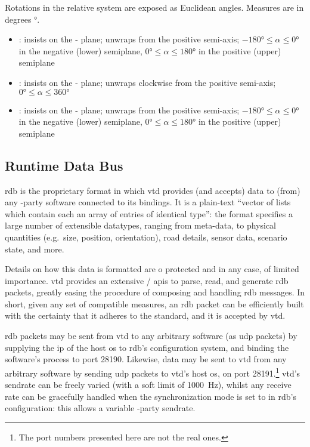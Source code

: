 \FLOATnoindent Rotations in the relative system are exposed as Euclidean angles. Measures are in degrees \si{\degree}.

\begin{itemize}
	\item {}: insists on the - plane; unwraps from the positive  semi-axis; $\ang{-180} \leqslant \alpha \leqslant \ang{0}$ in the negative (lower) semiplane, $\ang{0} \leqslant \alpha \leqslant \ang{180}$ in the positive (upper) semiplane
	\item {}: insists on the - plane; unwraps clockwise from the positive  semi-axis; $\ang{0} \leqslant \alpha \leqslant \ang{360}$
	\item {}: insists on the - plane; unwraps from the positive  semi-axis; $\ang{-180} \leqslant \alpha \leqslant \ang{0}$ in the negative (lower) semiplane, $\ang{0} \leqslant \alpha \leqslant \ang{180}$ in the positive (upper) semiplane
\end{itemize}

\subsection{Runtime Data Bus}

\gls{rdb} is the proprietary format in which \gls{vtd} provides (and accepts) data to (from) any -party software connected to its bindings. It is a plain-text \enquote{vector of lists which contain each an array of entries of identical type}{\cite{software:rdbfaqs}}: the format specifies a large number of extensible datatypes, ranging from meta-data, to physical quantities (e.g.\ size, position, orientation), road details, sensor data, scenario state, and more.

Details on how this data is formatted are o protected and in any case, of limited importance. \gls{vtd} provides an extensive / \glspl{api} to parse, read, and generate \gls{rdb} \glspl{packet}, greatly easing the procedure of composing and handling \gls{rdb} messages. In short, given any set of compatible measures, an \gls{rdb} \gls{packet} can be efficiently built with the certainty that it adheres to the standard, and it is accepted by \gls{vtd}.

\gls{rdb} \glspl{packet} may be sent from \gls{vtd} to any arbitrary software (as \gls{udp} packets) by supplying the \gls{ip} of the host \gls{os} to \gls{rdb}'s configuration system, and binding the software's process to port \num{28190}. Likewise, data may be sent to \gls{vtd} from any arbitrary software by sending \gls{udp} packets to \gls{vtd}'s host \gls{os}, on port \num{28191}.\footnote{The port numbers presented here are not the real ones.} \gls{vtd}'s \gls{sendrate} can be freely varied (with a soft limit of \SI{1000}{\hertz}), whilst any receive rate can be gracefully handled when the synchronization mode is set to  in \gls{rdb}'s configuration: this allows a variable -party \gls{sendrate}.

